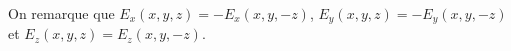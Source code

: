 \documentclass[french]{yLectureNote}
\renewcommand{\vec}{\overrightarrow}
\newcommand{\E}{\vec{E}(M)}
\begin{document}
On remarque que \(E_x(x,y,z) = - E_x(x,y,-z)\), \(E_y(x,y,z) = - E_y(x,y,-z)\) et \(E_z(x,y,z) = E_z(x,y,-z)\).
%
%
\end{document}
